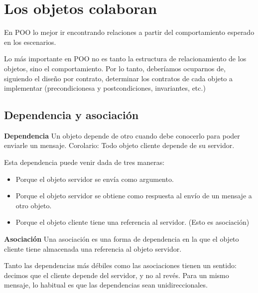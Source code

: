 \documentclass[../main.tex]{subfiles}
\begin{document}
\section{Los objetos colaboran} 
    En POO lo mejor ir encontrando relaciones a partir del comportamiento esperado en los escenarios.

    Lo más importante en POO no es tanto la estructura de relacionamiento de los objetos, sino el comportamiento. Por lo tanto, deberíamos ocuparnos de, siguiendo el diseño por contrato,  determinar los contratos de cada objeto a implementar (precondicionesa y postcondiciones, invariantes, etc.) 

    \subsection{Dependencia y asociación}
        \begin{definition} \textbf{Dependencia}
            Un objeto depende de otro cuando debe conocerlo para poder enviarle un mensaje.
            Corolario:
            Todo objeto cliente depende de su servidor.    
        \end{definition}

        Esta dependencia puede venir dada de tres maneras:
        \begin{itemize}
            \item Porque el objeto servidor se envía como argumento.
            \item Porque el objeto servidor se obtiene como respuesta al envío de un mensaje a otro
            objeto.
            \item Porque el objeto cliente tiene una referencia al servidor. (Esto es asociación)
        \end{itemize}        


        \begin{definition} \textbf{Asociación}
            Una asociación es una forma de dependencia en la que el objeto cliente tiene almacenada una referencia al objeto servidor.
            
        \end{definition}

        Tanto las dependencias más débiles como las asociaciones tienen un sentido: decimos que el
        cliente depende del servidor, y no al revés. Para un mismo mensaje, lo habitual es que las
        dependencias sean unidireccionales.
\end{document}
